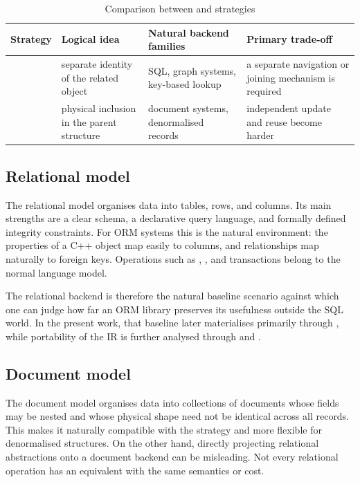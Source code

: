 \begin{table}[H]
\centering
\small
\caption{Comparison between  and  strategies}
\label{tab:relationship_strategies}
\begin{tabularx}{\textwidth}{L{2.8cm}L{3.2cm}L{3.0cm}Y}
\toprule
\textbf{Strategy} & \textbf{Logical idea} & \textbf{Natural backend families} & \textbf{Primary trade-off} \\
\midrule
{} & separate identity of the related object & SQL, graph systems, key-based lookup & a separate navigation or joining mechanism is required \\
 & physical inclusion in the parent structure & document systems, denormalised records & independent update and reuse become harder \\
\bottomrule
\end{tabularx}
\end{table}

\subsection{Relational model}

The relational model organises data into tables, rows, and columns. Its main strengths are a clear schema, a declarative query language, and formally defined integrity constraints. For ORM systems this is the natural environment: the properties of a C++ object map easily to columns, and relationships map naturally to foreign keys. Operations such as , , and transactions belong to the normal language model.

The relational backend is therefore the natural baseline scenario against which one can judge how far an ORM library preserves its usefulness outside the SQL world. In the present work, that baseline later materialises primarily through , while portability of the IR is further analysed through  and .

\subsection{Document model}

The document model organises data into collections of documents whose fields may be nested and whose physical shape need not be identical across all records. This makes it naturally compatible with the  strategy and more flexible for denormalised structures. On the other hand, directly projecting relational abstractions onto a document backend can be misleading. Not every relational operation has an equivalent with the same semantics or cost.


